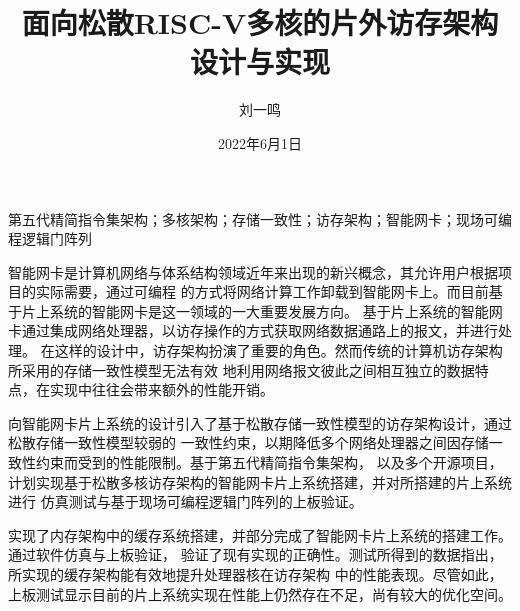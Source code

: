 \documentclass[supercite,notofont,hustthesis]{HustGraduPaper}
\title{面向松散RISC-V多核的片外访存架构设计与实现}
\author{刘一鸣}
\date{2022年6月1日}
\begin{document}
\maketitle

\statement

\clearpage


\begin{cnabstract}{第五代精简指令集架构；多核架构；存储一致性；访存架构；智能网卡；现场可编程逻辑门阵列}

智能网卡是计算机网络与体系结构领域近年来出现的新兴概念，其允许用户根据项目的实际需要，通过可编程
的方式将网络计算工作卸载到智能网卡上。而目前基于片上系统的智能网卡是这一领域的一大重要发展方向。
基于片上系统的智能网卡通过集成网络处理器，以访存操作的方式获取网络数据通路上的报文，并进行处理。
在这样的设计中，访存架构扮演了重要的角色。然而传统的计算机访存架构所采用的存储一致性模型无法有效
地利用网络报文彼此之间相互独立的数据特点，在实现中往往会带来额外的性能开销。

向智能网卡片上系统的设计引入了基于松散存储一致性模型的访存架构设计，通过松散存储一致性模型较弱的
一致性约束，以期降低多个网络处理器之间因存储一致性约束而受到的性能限制。基于第五代精简指令集架构，
以及多个开源项目，计划实现基于松散多核访存架构的智能网卡片上系统搭建，并对所搭建的片上系统进行
仿真测试与基于现场可编程逻辑门阵列的上板验证。

实现了内存架构中的缓存系统搭建，并部分完成了智能网卡片上系统的搭建工作。通过软件仿真与上板验证，
验证了现有实现的正确性。测试所得到的数据指出，所实现的缓存架构能有效地提升处理器核在访存架构
中的性能表现。尽管如此，上板测试显示目前的片上系统实现在性能上仍然存在不足，尚有较大的优化空间。

\end{cnabstract}
\end{document}

